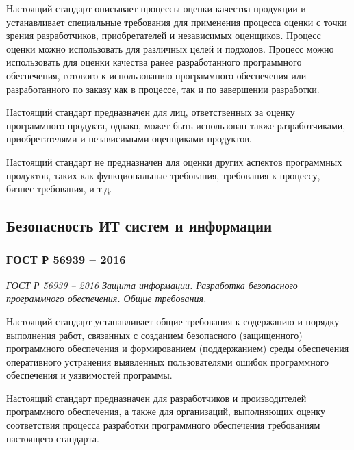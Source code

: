 Настоящий стандарт описывает процессы оценки качества продукции
и устанавливает специальные требования
для применения процесса оценки с точки зрения разработчиков,
приобретателей и независимых оценщиков.
Процесс оценки можно использовать для различных целей и подходов.
Процесс можно использовать
для оценки качества ранее разработанного программного обеспечения,
готового к использованию программного обеспечения
или разработанного по заказу как в процессе, так и по завершении разработки.

Настоящий стандарт предназначен для лиц,
ответственных за оценку программного продукта, однако,
может быть использован также разработчиками,
приобретателями и независимыми оценщиками продуктов.

Настоящий стандарт не предназначен
для оценки других аспектов программных продуктов,
таких как функциональные требования,
требования к процессу, бизнес-требования, и т.д.


\subsection{Безопасность ИТ систем и информации}

\subsubsection{ГОСТ Р 56939 -- 2016}

\emph{\href{https://docs.cntd.ru/document/1200135525}{ГОСТ Р 56939 -- 2016}
Защита информации.
Разработка безопасного программного обеспечения.
Общие требования.
}

Настоящий стандарт устанавливает общие требования к содержанию
и порядку выполнения работ, связанных с созданием безопасного (защищенного)
программного обеспечения и формированием (поддержанием)
среды обеспечения оперативного устранения выявленных пользователями
ошибок программного обеспечения и уязвимостей программы.

Настоящий стандарт предназначен для разработчиков
и производителей программного обеспечения, а также для организаций,
выполняющих оценку соответствия процесса разработки
программного обеспечения требованиям настоящего стандарта.

